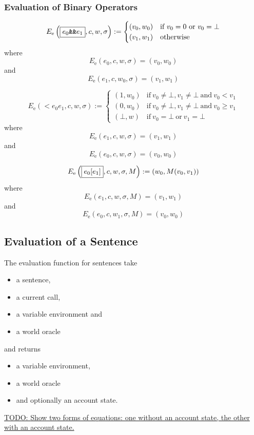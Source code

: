 \documentclass{book}
\newcommand{\todo}[1]{\underline{TODO: {#1}}}
\newcommand{\evalE}[1]{E_\mathrm{e}\left({#1}\right)}
\begin{document}
\subsubsection{Evaluation of Binary Operators}

\[
\evalE{\boxed{\logicalAnd{e_0}{e_1}}, c, w, \sigma} :=
\begin{cases}
  (v_0, w_0) & \text{if}\ v_0 = 0\ \text{or}\ v_0 = \bot \\
  (v_1, w_1) & \text{otherwise}
\end{cases}
\]
where
\[
\evalE{\boxed{e_0}, c, w, \sigma} = (v_0, w_0)
\]
and
\[
\evalE{\boxed{e_1}, c, w_0, \sigma} = (v_1, w_1)
\]

\[
\evalE{\boxed{\lt{e_0}{e_1}}, c, w, \sigma} :=
\begin{cases}
  (1, w_0) &\text{if}\ v_0 \neq \bot, v_1 \neq\bot\ \text{and}\ v_0 < v_1 \\
  (0, w_0) &\text{if}\ v_0 \neq \bot, v_1 \neq\bot\ \text{and}\ v_0 \ge v_1 \\
  (\bot, w) &\text{if}\ v_0 = \bot \ \text{or}\ v_1 = \bot
\end{cases}
\]
where
\[
\evalE{\boxed{e_1}, c, w, \sigma} = (v_1, w_1)
\]
and
\[
\evalE{\boxed{e_0}, c, w, \sigma} = (v_0, w_0)
\]

\[
\evalE{\boxed{\arrayAccess{e_0}{e_1}}, c, w, \sigma, M} :=
(w_0, M(v_0, v_1))
\]
where
\[
\evalE{\boxed{e_1}, c, w, \sigma, M} = (v_1, w_1)
\]
and
\[
\evalE{\boxed{e_0}, c, w_1, \sigma, M} = (v_0, w_0)
\]

\subsection{Evaluation of a Sentence}

The evaluation function for sentences take
\begin{itemize}
\item a sentence,
\item a current call,
\item a variable environment and
\item a world oracle
\end{itemize}
and returns
\begin{itemize}
\item a variable environment,
\item a world oracle
\item and optionally an account state.
\end{itemize}

\todo{Show two forms of equations: one without an account state, the other with an account state.}
\end{document}
